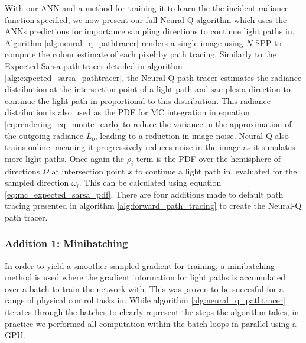\documentclass[../dissertation.tex]{subfiles}
\begin{document}
With our ANN and a method for training it to learn the the incident radiance function specified, we now present our full Neural-Q algorithm which uses the ANNs predictions for importance sampling directions to continue light paths in. Algorithm \ref{alg:neural_q_pathtracer} renders a single image using $N$ SPP to compute the colour estimate of each pixel by path tracing. Similarly to the Expected Sarsa path tracer detailed in algorithm \ref{alg:expected_sarsa_pathtracer}, the Neural-Q path tracer estimates the radiance distribution at the intersection point of a light path and samples a direction to continue the light path in proportional to this distribution. This radiance distribution is also used as the PDF for MC integration in equation \ref{eq:rendering_eq_monte_carlo} to reduce the variance in the approximation of the outgoing radiance $L_o$, leading to a reduction in image noise. Neural-Q also trains online, meaning it progressively reduces noise in the image as it simulates more light paths. Once again the $\rho_i$ term is the PDF over the hemisphere of directions $\Omega$ at intersection point $x$ to continue a light path in, evaluated for the sampled direction $\omega_i$. This can be calculated using equation \ref{eq:mc_expected_sarsa_pdf}. There are four additions made to default path tracing presented in algorithm \ref{alg:forward_path_tracing} to create the Neural-Q path tracer.

\subsubsection*{Addition 1: Minibatching}
In order to yield a smoother sampled gradient for training, a minibatching method is used where the gradient information for light paths is accumulated over a batch to train the network with. This was proven to be succesful for a range of physical control tasks in\cite{lillicrap2015continuous}. While algorithm \ref{alg:neural_q_pathtracer} iterates through the batches to clearly represent the steps the algorithm takes, in practice we performed all computation within the batch loops in parallel using a GPU.
\end{document}
